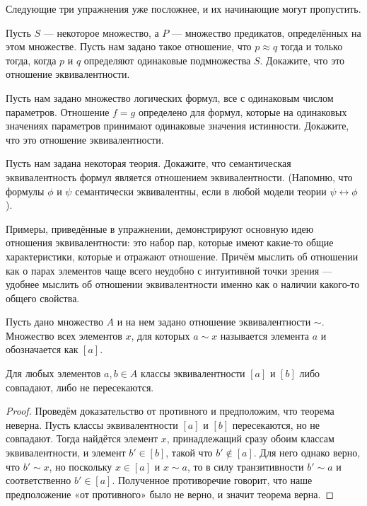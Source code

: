 Следующие три упражнения уже посложнее, и их начинающие могут пропустить.

\begin{exercise}
Пусть $S$ — некоторое множество, а $P$ — множество предикатов, определённых на этом множестве. Пусть нам задано такое отношение, что $p \approx q$ тогда и только тогда, когда $p$ и $q$ определяют одинаковые подмножества $S$. Докажите, что это отношение эквивалентности.
\end{exercise}

\begin{exercise}
Пусть нам задано множество логических формул, все с одинаковым числом параметров. Отношение $f=g$ определено для формул, которые на одинаковых значениях параметров принимают одинаковые значения истинности. Докажите, что это отношение эквивалентности.
\end{exercise}

\begin{exercise}
Пусть нам задана некоторая теория. Докажите, что семантическая эквивалентность формул является отношением эквивалентности. (Напомню, что формулы $\phi$ и $\psi$ семантически эквивалентны, если в любой модели теории $\psi\leftrightarrow\phi$).
\end{exercise}

Примеры, приведённые в упражнении, демонстрируют основную идею отношения эквивалентности: это набор пар, которые имеют какие-то общие характеристики, которые и отражают отношение. Причём мыслить об отношении как о парах элементов чаще всего неудобно с интуитивной точки зрения — удобнее мыслить об отношении эквивалентности именно как о наличии какого-то общего свойства.

\begin{definition}
Пусть дано множество $A$ и на нем задано отношение эквивалентности $\sim$. Множество всех элементов $x$, для которых $a\sim x$ называется  элемента $a$ и обозначается как $[a]$.
\end{definition}

\begin{thm}
Для любых элементов $a, b \in A$ классы эквивалентности $[a]$ и $[b]$ либо совпадают, либо не пересекаются.
\end{thm}
\begin{proof}
Проведём доказательство от противного и предположим, что теорема неверна. Пусть классы эквивалентности $[a]$ и $[b]$ пересекаются, но не совпадают. Тогда найдётся элемент $x$, принадлежащий сразу обоим классам эквивалентности, и элемент $b' \in [b]$, такой что $b' \not\in [a]$. Для него однако верно, что $b' \sim x$, но поскольку $x \in [a]$ и $x\sim a$, то в силу транзитивности $b' \sim a$ и соответственно $b' \in [a]$. Полученное противоречие говорит, что наше предположение «от противного» было не верно, и значит теорема верна.
\end{proof}

